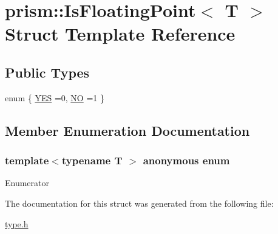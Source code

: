 \hypertarget{structprism_1_1_is_floating_point}{}\section{prism\+:\+:Is\+Floating\+Point$<$ T $>$ Struct Template Reference}
\label{structprism_1_1_is_floating_point}
\subsection*{Public Types}
\begin{DoxyCompactItemize}
\item 
enum \{ \hyperlink{structprism_1_1_is_floating_point_a743b9c5b944700987ab311af7454016eaa2d85d7cd8be84ef1d1a7487c0b8de92}{Y\+ES} =0, 
\hyperlink{structprism_1_1_is_floating_point_a743b9c5b944700987ab311af7454016eaeb8568a4bcef3a8b36fc75a91b97a566}{NO} =1
 \}
\end{DoxyCompactItemize}


\subsection{Member Enumeration Documentation}
\subsubsection[{\texorpdfstring{anonymous enum}{anonymous enum}}]{\setlength{\rightskip}{0pt plus 5cm}template$<$typename T $>$ anonymous enum}\hypertarget{structprism_1_1_is_floating_point_a743b9c5b944700987ab311af7454016e}{}\label{structprism_1_1_is_floating_point_a743b9c5b944700987ab311af7454016e}
\begin{Desc}
\item[Enumerator]\par
\begin{description}
\item[{\em 
Y\+ES\hypertarget{structprism_1_1_is_floating_point_a743b9c5b944700987ab311af7454016eaa2d85d7cd8be84ef1d1a7487c0b8de92}{}\label{structprism_1_1_is_floating_point_a743b9c5b944700987ab311af7454016eaa2d85d7cd8be84ef1d1a7487c0b8de92}
}]\item[{\em 
NO\hypertarget{structprism_1_1_is_floating_point_a743b9c5b944700987ab311af7454016eaeb8568a4bcef3a8b36fc75a91b97a566}{}\label{structprism_1_1_is_floating_point_a743b9c5b944700987ab311af7454016eaeb8568a4bcef3a8b36fc75a91b97a566}
}]\end{description}
\end{Desc}


The documentation for this struct was generated from the following file\+:\begin{DoxyCompactItemize}
\item 
\hyperlink{type_8h}{type.\+h}\end{DoxyCompactItemize}
